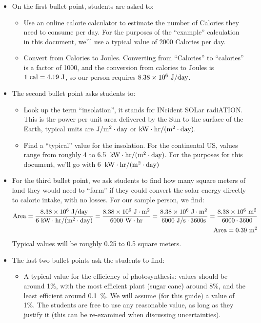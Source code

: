 \documentclass[fleqn,letterpaper]{article}
\begin{document}
\begin{itemize}
 \item{On the first bullet point, students are asked to:
  \begin{itemize}
   \item{Use an online calorie calculator to estimate the number of Calories they need to consume per day.  For the purposes of the ``example'' calculation in this document, we'll use a typical value of 2000 Calories per day.} 
   \item{Convert from Calories to Joules.  Converting from ``Calories'' to ``calories'' is a factor of 1000, and the conversion from calories to Joules is $1~{\rm cal} = 4.19~{\rm J}$, so our person requires $8.38 \times 10^6~{\rm J/day}$.}
  \end{itemize}
}
 \item{The second bullet point asks students to:
 \begin{itemize}
 \item{Look up the term ``insolation'', it stands for INcident SOLar radiATION.  This is the power per unit area delivered by the Sun to the surface of the Earth, typical units are ${\rm J}/{\rm m^2 \cdot day}$ or ${\rm kW \cdot hr/(m^2\cdot day)}$.}
 \item{Find a ``typical'' value for the insolation.  For the continental US, values range from roughly 4 to 6.5~${\rm kW \cdot hr/(m^2\cdot day)}$.  For the purposes for this document, we'll go with 6~${\rm kW \cdot hr/(m^2\cdot day)}$}
 \end{itemize}}
 \item{For the third bullet point, we ask students to find how many square meters of land they would need to ``farm'' if they could convert the solar energy directly to caloric intake, with no losses.  For our sample person, we find:
 \begin{eqnarray}
  {\rm Area} = \frac{8.38 \times 10^6~{\rm J/day}}{6~{\rm kW \cdot hr/(m^2\cdot day)}}
  = \frac{8.38 \times 10^6~{\rm J \cdot m^2}}{6000~{\rm W \cdot hr}} = \frac{8.38 \times 10^6~{\rm J\cdot m^2}}{6000~{\rm J/s \cdot 3600 s}} = \frac{8.38 \times 10^6~{\rm m^2}}{6000\cdot 3600} \\
  {\rm Area} = 0.39~{\rm m^2}
 \end{eqnarray}
 Typical values will be roughly 0.25 to 0.5 square meters.
}
  \item{The last two bullet points ask the students to find:
    \begin{itemize}
    \item{A typical value for the efficiency of photosynthesis:  values should be around 1\%, with the most efficient plant (sugar cane) around 8\%, and the least efficient around 0.1~\%.  We will assume (for this guide) a value of 1\%.  The students are free to use any reasonable value, as long as they justify it (this can be re-examined when discussing uncertainties).}

\end{itemize}}
\end{itemize}
\end{document}
